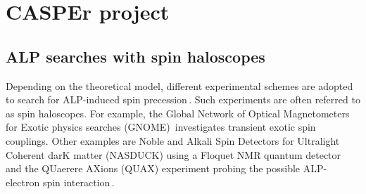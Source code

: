 


\section{CASPEr project}\label{sec:intro:CASPEr}

\subsection{ALP searches with spin haloscopes}

Depending on the theoretical model, different experimental schemes are adopted to search for ALP-induced spin precession\,\cite{Kimball2023_search}.
Such experiments are often referred to as spin haloscopes.
For example, the Global Network of Optical Magnetometers for Exotic physics searches (GNOME)\,\cite{Pustelny_AdP_GNOMEnovel, Pospelov_PhysRevLett_DomainWalls, Kimball_2018_PhysRevD_terrestrial, Masia-Roig_2020_Analysismethod, Afach_2021_topological} investigates transient exotic spin couplings.
Other examples are Noble and Alkali Spin Detectors for Ultralight Coherent darK matter (NASDUCK) using a Floquet NMR quantum detector\,\cite{bloch2105nasduck} and the QUaerere AXions (QUAX) experiment probing the possible ALP-electron spin interaction\,\cite{Crescini2020_Ferromagnetic}.

